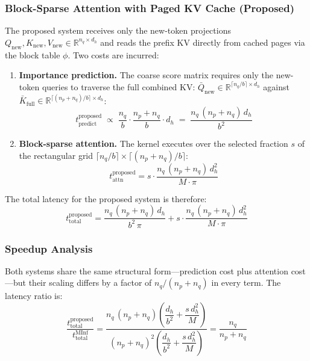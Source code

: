\documentclass{article}
\begin{document}
\subsubsection*{Block-Sparse Attention with Paged KV Cache (Proposed)}

The proposed system receives only the new-token projections
$Q_{\text{new}}, K_{\text{new}}, V_{\text{new}} \in \mathbb{R}^{n_q \times d_h}$
and reads the prefix KV directly from cached pages via the block table
$\phi$. Two costs are incurred:

\begin{enumerate}
  \item \textbf{Importance prediction.} The coarse score matrix requires
    only the new-token queries to traverse the full combined KV:
    $\bar{Q}_{\text{new}} \in \mathbb{R}^{\lceil n_q/b \rceil \times d_h}$
    against $\bar{K}_{\text{full}} \in \mathbb{R}^{\lceil(n_p+n_q)/b\rceil \times d_h}$:
    \begin{equation}
      t_{\text{predict}}^{\text{proposed}}
      \;\propto\; \frac{n_q}{b} \cdot \frac{n_p+n_q}{b} \cdot d_h
      \;=\; \frac{n_q\,(n_p+n_q)\,d_h}{b^2}
      \label{eq:t-pred-proposed}
    \end{equation}

  \item \textbf{Block-sparse attention.} The kernel executes over the
    selected fraction $s$ of the rectangular grid
    $\lceil n_q/b \rceil \times \lceil(n_p+n_q)/b\rceil$:
    \begin{equation}
      t_{\text{attn}}^{\text{proposed}}
      = s \cdot \frac{n_q\,(n_p+n_q)\,d_h^2}{M \cdot \pi}
      \label{eq:t-proposed-attn}
    \end{equation}
\end{enumerate}

The total latency for the proposed system is therefore:
\begin{equation}
  t_{\text{total}}^{\text{proposed}}
  = \frac{n_q\,(n_p+n_q)\,d_h}{b^2\,\pi}
    + s \cdot \frac{n_q\,(n_p+n_q)\,d_h^2}{M \cdot \pi}
  \label{eq:t-proposed-total}
\end{equation}

\subsubsection*{Speedup Analysis}

Both systems share the same structural form---prediction cost plus attention
cost---but their scaling differs by a factor of $n_q / (n_p + n_q)$ in
every term. The latency ratio is:
\begin{equation}
  \frac{t_{\text{total}}^{\text{proposed}}}{t_{\text{total}}^{\text{MInf}}}
  = \frac{n_q\,(n_p+n_q)\left(\dfrac{d_h}{b^2} + \dfrac{s\,d_h^2}{M}\right)}
         {(n_p+n_q)^2\left(\dfrac{d_h}{b^2} + \dfrac{s\,d_h^2}{M}\right)}
  = \frac{n_q}{n_p + n_q}
  \label{eq:speedup}
\end{equation}
\end{document}
